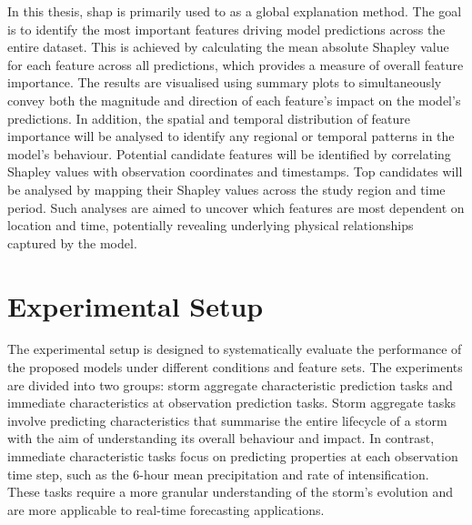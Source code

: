 In this thesis, \acrshort{shap} is primarily used to as a global explanation method. The goal is to identify the most important features driving model predictions across the entire dataset. This is achieved by calculating the mean absolute Shapley value for each feature across all predictions, which provides a measure of overall feature importance. The results are visualised using summary plots to simultaneously convey both the magnitude and direction of each feature's impact on the model's predictions. In addition, the spatial and temporal distribution of feature importance will be analysed to identify any regional or temporal patterns in the model's behaviour. Potential candidate features will be identified by correlating Shapley values with observation coordinates and timestamps. Top candidates will be analysed by mapping their Shapley values across the study region and time period. Such analyses are aimed to uncover which features are most dependent on location and time, potentially revealing underlying physical relationships captured by the model.

\section{Experimental Setup}

The experimental setup is designed to systematically evaluate the performance of the proposed models under different conditions and feature sets. The experiments are divided into two groups: storm aggregate characteristic prediction tasks and immediate characteristics at observation prediction tasks. Storm aggregate tasks involve predicting characteristics that summarise the entire lifecycle of a storm with the aim of understanding its overall behaviour and impact. In contrast, immediate characteristic tasks focus on predicting properties at each observation time step, such as the 6-hour mean precipitation and rate of intensification. These tasks require a more granular understanding of the storm's evolution and are more applicable to real-time forecasting applications.

